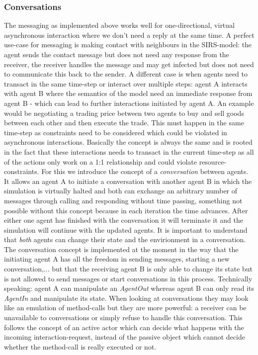 \subsubsection{Conversations}
The messaging as implemented above works well for one-directional, virtual asynchronous interaction where we don't need a reply at the same time. A perfect use-case for messaging is making contact with neighbours in the SIRS-model: the agent sends the contact message but does not need any response from the receiver, the receiver handles the message and may get infected but does not need to communicate this back to the sender. 
A different case is when agents need to transact in the same time-step or interact over multiple steps: agent A interacts with agent B where the semantics of the model need an immediate response from agent B - which can lead to further interactions initiated by agent A. An example would be negotiating a trading price between two agents to buy and sell goods between each other and then execute the trade. This must happen in the same time-step as constraints need to be considered which could be violated in asynchronous interactions. Basically the concept is always the same and is rooted in the fact that these interactions needs to transact in the current time-step as all of the actions only work on a 1:1 relationship and could violate resource-constraints.
For this we introduce the concept of a \textit{conversation} between agents. It allows an agent A to initiate a conversation with another agent B in which the simulation is virtually halted and both can exchange an arbitrary number of messages through calling and responding without time passing, something not possible without this concept because in each iteration the time advances. After either one agent has finished with the conversation it will terminate it and the simulation will continue with the updated agents. It is important to understand that \textit{both} agents can change their state and the envirionment in a conversation. The conversation concept is implemented at the moment in the way that the initiating agent A has all the freedom in sending messages, starting a new conversation,... but that the receiving agent B is only able to change its state but is not allowed to send messages or start conversations in this process. Technically speaking: agent A can manipulate an \textit{AgentOut} whereas agent B can only read its \textit{AgentIn} and manipulate its state.
When looking at conversations they may look like an emulation of method-calls but they are more powerful: a receiver can be unavailable to conversations or simply refuse to handle this conversation. This follows the concept of an active actor which can decide what happens with the incoming interaction-request, instead of the passive object which cannot decide whether the method-call is really executed or not.

